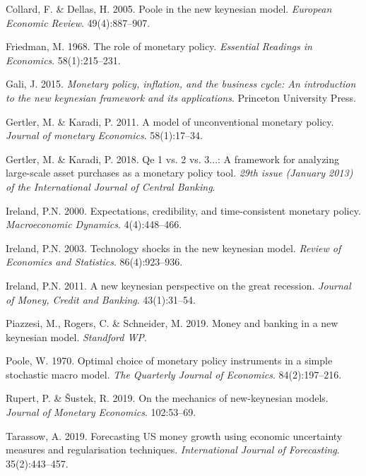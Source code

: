 \documentclass[11pt,preprint, authoryear]{elsarticle}
\numberwithin{equation}{section}
\numberwithin{figure}{section}
\numberwithin{table}{section}
\newlength{\cslhangindent}
\newenvironment{CSLReferences}%
  {\setlength{\parindent}{0pt}%
  \everypar{\setlength{\hangindent}{\cslhangindent}}\ignorespaces}%
  {\par}
\begin{document}
\begin{CSLReferences}{1}{0}
\leavevmode{}%
Collard, F. \& Dellas, H. 2005. Poole in the new keynesian model.
\emph{European Economic Review}. 49(4):887--907.

\leavevmode{}%
Friedman, M. 1968. The role of monetary policy. \emph{Essential Readings
in Economics}. 58(1):215--231.

\leavevmode{}%
Gali, J. 2015. \emph{Monetary policy, inflation, and the business cycle:
An introduction to the new keynesian framework and its applications}.
Princeton University Press.

\leavevmode{}%
Gertler, M. \& Karadi, P. 2011. A model of unconventional monetary
policy. \emph{Journal of monetary Economics}. 58(1):17--34.

\leavevmode{}%
Gertler, M. \& Karadi, P. 2018. Qe 1 vs. 2 vs. 3...: A framework for
analyzing large-scale asset purchases as a monetary policy tool.
\emph{29th issue (January 2013) of the International Journal of Central
Banking}.

\leavevmode{}%
Ireland, P.N. 2000. Expectations, credibility, and time-consistent
monetary policy. \emph{Macroeconomic Dynamics}. 4(4):448--466.

\leavevmode{}%
Ireland, P.N. 2003. Technology shocks in the new keynesian model.
\emph{Review of Economics and Statistics}. 86(4):923--936.

\leavevmode{}%
Ireland, P.N. 2011. A new keynesian perspective on the great recession.
\emph{Journal of Money, Credit and Banking}. 43(1):31--54.

\leavevmode{}%
Piazzesi, M., Rogers, C. \& Schneider, M. 2019. Money and banking in a
new keynesian model. \emph{Standford WP}.

\leavevmode{}%
Poole, W. 1970. Optimal choice of monetary policy instruments in a
simple stochastic macro model. \emph{The Quarterly Journal of
Economics}. 84(2):197--216.

\leavevmode{}%
Rupert, P. \& Šustek, R. 2019. On the mechanics of new-keynesian models.
\emph{Journal of Monetary Economics}. 102:53--69.

\leavevmode{}%
Tarassow, A. 2019. Forecasting US money growth using economic
uncertainty measures and regularisation techniques. \emph{International
Journal of Forecasting}. 35(2):443--457.


\end{CSLReferences}
\end{document}
